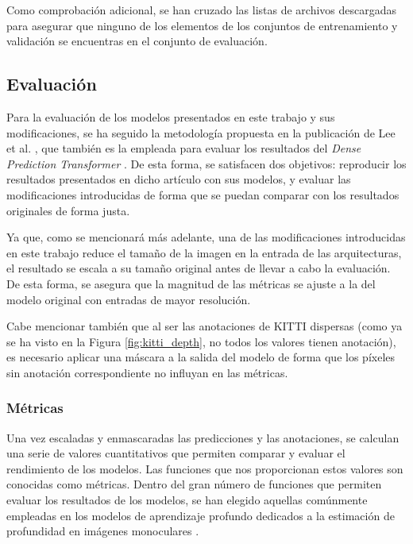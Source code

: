 Como comprobación adicional, se han cruzado las listas de archivos descargadas para asegurar que ninguno de los elementos de los conjuntos de entrenamiento y validación se encuentras en el conjunto de evaluación.




\subsection{Evaluación}
Para la evaluación de los modelos presentados en este trabajo y sus modificaciones, se ha seguido la metodología propuesta en la publicación de Lee et al. \cite{bts}, que también es la empleada para evaluar los resultados del \textit{Dense Prediction Transformer} \cite{visiontransformersDPT}. De esta forma, se satisfacen dos objetivos: reproducir los resultados presentados en dicho artículo con sus modelos, y evaluar las modificaciones introducidas de forma que se puedan comparar con los resultados originales de forma justa. 

Ya que, como se mencionará más adelante, una de las modificaciones introducidas en este trabajo reduce el tamaño de la imagen en la entrada de las arquitecturas, el resultado se escala a su tamaño original antes de llevar a cabo la evaluación. De esta forma, se asegura que la magnitud de las métricas se ajuste a la del modelo original con entradas de mayor resolución. 

Cabe mencionar también que al ser las anotaciones de KITTI dispersas (como ya se ha visto en la Figura \ref{fig:kitti_depth}, no todos los valores tienen anotación), es necesario aplicar una máscara a la salida del modelo de forma que los píxeles sin anotación correspondiente no influyan en las métricas.

\subsubsection{Métricas}
Una vez escaladas y enmascaradas las predicciones y las anotaciones, se calculan una serie de valores cuantitativos que permiten comparar y evaluar el rendimiento de los modelos. Las funciones que nos proporcionan estos valores son conocidas como métricas. Dentro del gran número de funciones que permiten evaluar los resultados de los modelos, se han elegido aquellas comúnmente empleadas en los modelos de aprendizaje profundo dedicados a la estimación de profundidad en imágenes monoculares \cite{visiontransformersDPT,midas-intel,eigen-multi-scale,bts,DORN,bhat2020adabins,evaluation-cnn-depth-estimation, depth-estimation-metrics}.

